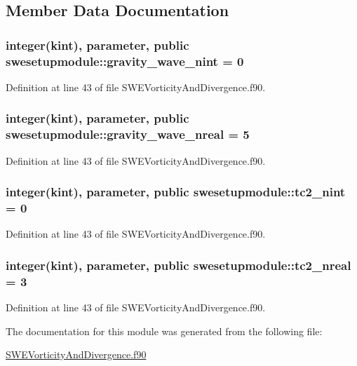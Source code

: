 \subsection{Member Data Documentation}
\hypertarget{classswesetupmodule_aab8508cab1eeccc906eefb8066f9fc2e}{
\subsubsection[{gravity\+\_\+wave\+\_\+nint}]{\setlength{\rightskip}{0pt plus 5cm}integer(kint), parameter, public swesetupmodule\+::gravity\+\_\+wave\+\_\+nint = 0}}\label{classswesetupmodule_aab8508cab1eeccc906eefb8066f9fc2e}


Definition at line 43 of file S\+W\+E\+Vorticity\+And\+Divergence.\+f90.

\hypertarget{classswesetupmodule_a3d425d5e6084c2bae3b2a89922cfd135}{
\subsubsection[{gravity\+\_\+wave\+\_\+nreal}]{\setlength{\rightskip}{0pt plus 5cm}integer(kint), parameter, public swesetupmodule\+::gravity\+\_\+wave\+\_\+nreal = 5}}\label{classswesetupmodule_a3d425d5e6084c2bae3b2a89922cfd135}


Definition at line 43 of file S\+W\+E\+Vorticity\+And\+Divergence.\+f90.

\hypertarget{classswesetupmodule_ace8d8c9faf9e8da9f13f36b1d2a7a2b8}{
\subsubsection[{tc2\+\_\+nint}]{\setlength{\rightskip}{0pt plus 5cm}integer(kint), parameter, public swesetupmodule\+::tc2\+\_\+nint = 0}}\label{classswesetupmodule_ace8d8c9faf9e8da9f13f36b1d2a7a2b8}


Definition at line 43 of file S\+W\+E\+Vorticity\+And\+Divergence.\+f90.

\hypertarget{classswesetupmodule_a5b2f9b5922de2fbbce1239096823856a}{
\subsubsection[{tc2\+\_\+nreal}]{\setlength{\rightskip}{0pt plus 5cm}integer(kint), parameter, public swesetupmodule\+::tc2\+\_\+nreal = 3}}\label{classswesetupmodule_a5b2f9b5922de2fbbce1239096823856a}


Definition at line 43 of file S\+W\+E\+Vorticity\+And\+Divergence.\+f90.



The documentation for this module was generated from the following file\+:\begin{DoxyCompactItemize}
\item 
\hyperlink{SWEVorticityAndDivergence_8f90}{S\+W\+E\+Vorticity\+And\+Divergence.\+f90}\end{DoxyCompactItemize}

